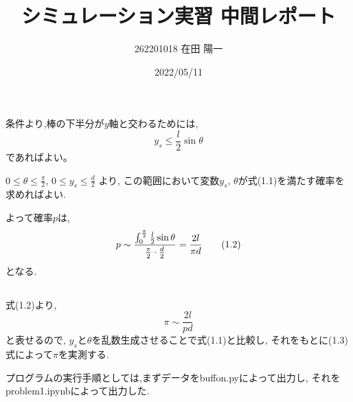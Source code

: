 \documentclass[a4paper,dvipdfmx]{jarticle}
\begin{document}
\title{シミュレーション実習 中間レポート}
\author{262201018 在田 陽一}
\date{2022/05/11}
\maketitle


\section{}
\subsection{}
\noindent

条件より,棒の下半分が$y$軸と交わるためには,
\begin{equation}
     y_s \leq \frac{l}{2}\sin\theta \tag{1.1}
\end{equation}
であればよい。

\noindent
$0 \leq \theta \leq \frac{\pi}{2}$, $0 \leq y_s \leq \frac{d}{2}$ より,
この範囲において変数$y_s$, $\theta$が式(1.1)を満たす確率を求めればよい.

\noindent
よって確率$p$は,
\begin{equation}
    p \sim \frac{\int^\frac{\pi}{2}_0 \frac{l}{2}\sin \theta}{\frac{\pi}{2} \cdot \frac{d}{2}} \\
     =\frac{2l}{\pi d} \tag{1.2}
\end{equation}
となる.

\subsection{}

\noindent
式(1.2)より,
\begin{equation}
   \pi \sim  \frac{2l}{pd} \tag{1.3}
\end{equation}
と表せるので, $y_s$と$\theta$を乱数生成させることで式(1.1)と比較し,
それをもとに(1.3)式によって$\pi$を実測する.

\noindent
プログラムの実行手順としては,まずデータをbuffon.pyによって出力し,
それをproblem1.ipynbによって出力した.


\section{}
\subsection{}
\end{document}
